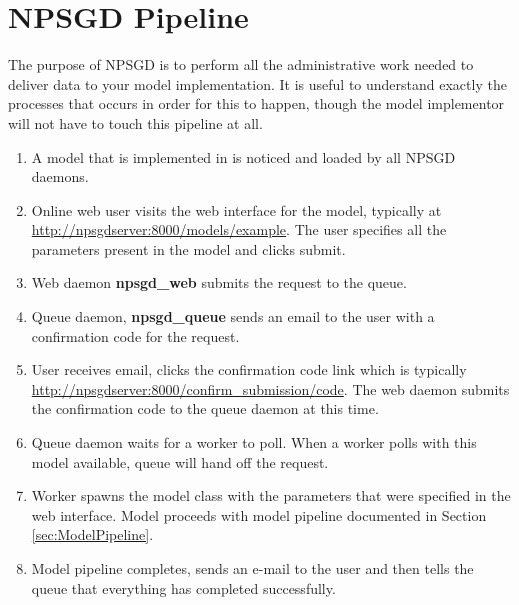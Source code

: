 \documentclass{article}
\begin{document}
\section{NPSGD Pipeline}
The purpose of NPSGD is to perform all the administrative work needed to deliver
data to your model implementation. It is useful to understand exactly the
processes that occurs in order for this to happen, though the model implementor
will not have to touch this pipeline at all.
\begin{enumerate}
   \item A model that is implemented in  is noticed and
   loaded by all NPSGD daemons.
   \item Online web user visits the web interface for the model, typically at
   \url{http://npsgdserver:8000/models/example}. The user specifies all the parameters
   present in the model and clicks submit.
   \item Web daemon \textbf{npsgd\_web} submits the request to the queue.
   \item Queue daemon, \textbf{npsgd\_queue} sends an email to the user with a
   confirmation code for the request.
   \item User receives email, clicks the confirmation code link which is
   typically \url{http://npsgdserver:8000/confirm_submission/code}. The web
   daemon submits the confirmation code to the queue daemon at this time.
   \item Queue daemon waits for a worker to poll. When a worker polls with this
   model available, queue will hand off the request. 
   \item Worker spawns the model class with the parameters that were specified
   in the web interface. Model proceeds with model pipeline documented in
   Section \ref{sec:ModelPipeline}.
   \item Model pipeline completes, sends an e-mail to the user and then tells
   the queue that everything has completed successfully.
\end{enumerate}
\end{document}

